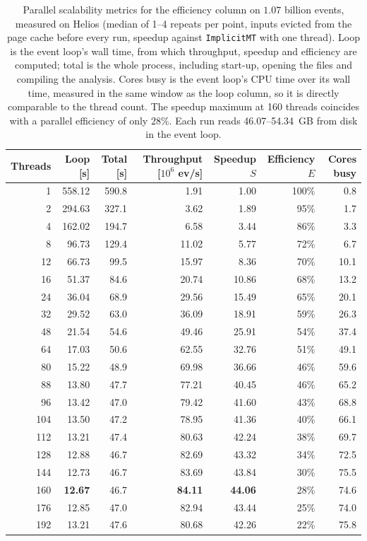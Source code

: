 \begin{table}[htbp]
\centering
\caption{Parallel scalability metrics for the efficiency column on $1.07$ billion events, measured on Helios (median of 1--4 repeats per point, inputs evicted from the page cache before every run, speedup against \texttt{ImplicitMT} with one thread). Loop is the event loop's wall time, from which throughput, speedup and efficiency are computed; total is the whole process, including start-up, opening the files and compiling the analysis. Cores busy is the event loop's CPU time over its wall time, measured in the same window as the loop column, so it is directly comparable to the thread count. The speedup maximum at 160 threads coincides with a parallel efficiency of only $28\%$. Each run reads 46.07--54.34~GB from disk in the event loop.}
\label{tab:scalability-efficiency}
\setlength{\tabcolsep}{5pt}
\begin{tabular}{rrrrrrr}
\toprule
Threads & Loop [s] & Total [s] & Throughput [$10^6$ ev/s] & Speedup $S$ & Efficiency $E$ & Cores busy \\
\midrule
 1 & 558.12 & 590.8 & 1.91 & 1.00 & 100\% & 0.8 \\
 2 & 294.63 & 327.1 & 3.62 & 1.89 & 95\% & 1.7 \\
 4 & 162.02 & 194.7 & 6.58 & 3.44 & 86\% & 3.3 \\
 8 & 96.73 & 129.4 & 11.02 & 5.77 & 72\% & 6.7 \\
12 & 66.73 & 99.5 & 15.97 & 8.36 & 70\% & 10.1 \\
16 & 51.37 & 84.6 & 20.74 & 10.86 & 68\% & 13.2 \\
24 & 36.04 & 68.9 & 29.56 & 15.49 & 65\% & 20.1 \\
32 & 29.52 & 63.0 & 36.09 & 18.91 & 59\% & 26.3 \\
48 & 21.54 & 54.6 & 49.46 & 25.91 & 54\% & 37.4 \\
64 & 17.03 & 50.6 & 62.55 & 32.76 & 51\% & 49.1 \\
80 & 15.22 & 48.9 & 69.98 & 36.66 & 46\% & 59.6 \\
88 & 13.80 & 47.7 & 77.21 & 40.45 & 46\% & 65.2 \\
96 & 13.42 & 47.0 & 79.42 & 41.60 & 43\% & 68.8 \\
104 & 13.50 & 47.2 & 78.95 & 41.36 & 40\% & 66.1 \\
112 & 13.21 & 47.4 & 80.63 & 42.24 & 38\% & 69.7 \\
128 & 12.88 & 46.7 & 82.69 & 43.32 & 34\% & 72.5 \\
144 & 12.73 & 46.7 & 83.69 & 43.84 & 30\% & 75.5 \\
160 & \textbf{12.67} & 46.7 & \textbf{84.11} & \textbf{44.06} & 28\% & 74.6 \\
176 & 12.85 & 47.0 & 82.94 & 43.44 & 25\% & 74.0 \\
192 & 13.21 & 47.6 & 80.68 & 42.26 & 22\% & 75.8 \\
\bottomrule
\end{tabular}
\end{table}
